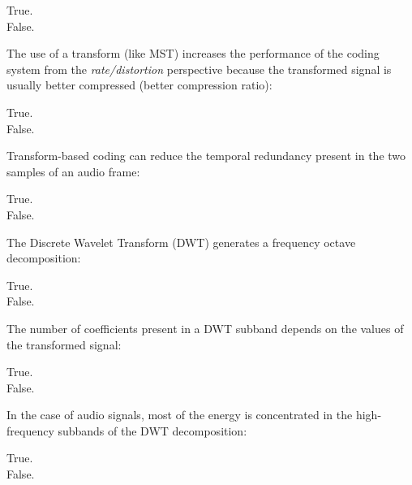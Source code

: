 \documentclass[legalpaper, 12pt, addpoints]{exam}
\begin{document}
\begin{questions}
\begin{oneparchoices}
  \choice True.\\
  \choice False.
\end{oneparchoices}
  
\vspace{0.10in}

\question The use of a transform (like MST) increases the performance of the coding system from the \emph{rate/distortion} perspective because the transformed signal is usually better compressed (better compression ratio):

\begin{oneparchoices}
  \choice True.\\
  \choice False.
\end{oneparchoices}
  
\vspace{0.10in}

\question Transform-based coding can reduce the temporal redundancy present in the two samples of an audio frame:

\begin{oneparchoices}
  \choice True.\\
  \choice False.
\end{oneparchoices}
  
\vspace{0.10in}

\question The Discrete Wavelet Transform (DWT) generates a frequency octave decomposition:

\begin{oneparchoices}
  \choice True.\\
  \choice False.
\end{oneparchoices}
  
\vspace{0.10in}

\question The number of coefficients present in a DWT subband depends on the values of the transformed signal:

\begin{oneparchoices}
  \choice True.\\
  \choice False.
\end{oneparchoices}
  
\vspace{0.10in}

\question In the case of audio signals, most of the energy is concentrated in the high-frequency subbands of the DWT decomposition:

\begin{oneparchoices}
  \choice True.\\
  \choice False.
\end{oneparchoices}
  

\end{questions}
\end{document}
